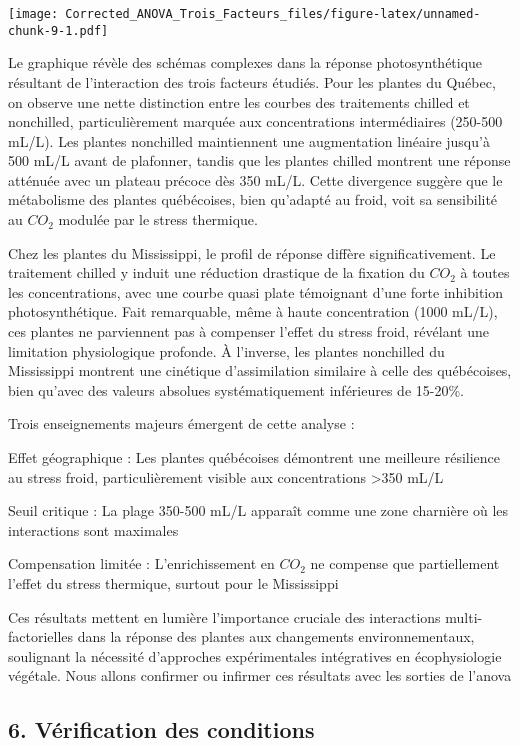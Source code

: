 \documentclass[
]{article}
\begin{document}
\texttt{[image: Corrected\_ANOVA\_Trois\_Facteurs\_files/figure-latex/unnamed-chunk-9-1.pdf]}

Le graphique révèle des schémas complexes dans la réponse
photosynthétique résultant de l'interaction des trois facteurs étudiés.
Pour les plantes du Québec, on observe une nette distinction entre les
courbes des traitements chilled et nonchilled, particulièrement marquée
aux concentrations intermédiaires (250-500 mL/L). Les plantes nonchilled
maintiennent une augmentation linéaire jusqu'à 500 mL/L avant de
plafonner, tandis que les plantes chilled montrent une réponse atténuée
avec un plateau précoce dès 350 mL/L. Cette divergence suggère que le
métabolisme des plantes québécoises, bien qu'adapté au froid, voit sa
sensibilité au \(CO_2\) modulée par le stress thermique.

Chez les plantes du Mississippi, le profil de réponse diffère
significativement. Le traitement chilled y induit une réduction
drastique de la fixation du \(CO_2\) à toutes les concentrations, avec
une courbe quasi plate témoignant d'une forte inhibition
photosynthétique. Fait remarquable, même à haute concentration (1000
mL/L), ces plantes ne parviennent pas à compenser l'effet du stress
froid, révélant une limitation physiologique profonde. À l'inverse, les
plantes nonchilled du Mississippi montrent une cinétique d'assimilation
similaire à celle des québécoises, bien qu'avec des valeurs absolues
systématiquement inférieures de 15-20\%.

Trois enseignements majeurs émergent de cette analyse :

Effet géographique : Les plantes québécoises démontrent une meilleure
résilience au stress froid, particulièrement visible aux concentrations
\textgreater350 mL/L

Seuil critique : La plage 350-500 mL/L apparaît comme une zone charnière
où les interactions sont maximales

Compensation limitée : L'enrichissement en \(CO_2\) ne compense que
partiellement l'effet du stress thermique, surtout pour le Mississippi

Ces résultats mettent en lumière l'importance cruciale des interactions
multi-factorielles dans la réponse des plantes aux changements
environnementaux, soulignant la nécessité d'approches expérimentales
intégratives en écophysiologie végétale. Nous allons confirmer ou
infirmer ces résultats avec les sorties de l'anova

\subsection{6. Vérification des
conditions}\label{vuxe9rification-des-conditions}
\end{document}
